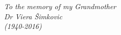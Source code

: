 \begin{center}
    \thispagestyle{empty}
    \vspace*{\fill}
    \textit{To the memory of my Grandmother \\
                Dr Viera \v{S}imkovic \\
                       (1940-2016)
           }
    \vspace*{\fill}
\end{center}
